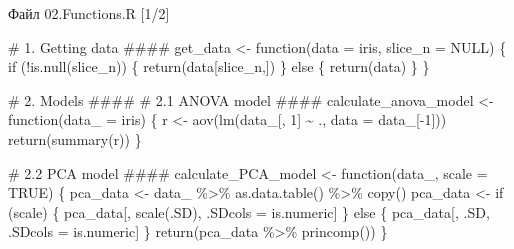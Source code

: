 \documentclass[
  ignorenonframetext,
]{beamer}
\newenvironment{Shaded}{\begin{snugshade}}{\end{snugshade}}
\newcommand{\AttributeTok}[1]{\textcolor[rgb]{0.40,0.45,0.13}{#1}}
\newcommand{\CommentTok}[1]{\textcolor[rgb]{0.37,0.37,0.37}{#1}}
\newcommand{\ConstantTok}[1]{\textcolor[rgb]{0.56,0.35,0.01}{#1}}
\newcommand{\ControlFlowTok}[1]{\textcolor[rgb]{0.00,0.23,0.31}{#1}}
\newcommand{\DecValTok}[1]{\textcolor[rgb]{0.68,0.00,0.00}{#1}}
\newcommand{\FunctionTok}[1]{\textcolor[rgb]{0.28,0.35,0.67}{#1}}
\newcommand{\NormalTok}[1]{\textcolor[rgb]{0.00,0.23,0.31}{#1}}
\newcommand{\OtherTok}[1]{\textcolor[rgb]{0.00,0.23,0.31}{#1}}
\newcommand{\SpecialCharTok}[1]{\textcolor[rgb]{0.37,0.37,0.37}{#1}}
\begin{document}
\begin{frame}[fragile]{Файл 02.Functions.R {[}1/2{]}}
\label{ux444ux430ux439ux43b-02.functions.r-12}
\begin{Shaded}
\begin{Highlighting}[]
\CommentTok{\# 1. Getting data           \#\#\#\#}
\NormalTok{get\_data }\OtherTok{\textless{}{-}} \ControlFlowTok{function}\NormalTok{(}\AttributeTok{data =}\NormalTok{ iris, }\AttributeTok{slice\_n =} \ConstantTok{NULL}\NormalTok{) \{}
  \ControlFlowTok{if}\NormalTok{ (}\SpecialCharTok{!}\FunctionTok{is.null}\NormalTok{(slice\_n)) \{}
    \FunctionTok{return}\NormalTok{(data[slice\_n,])}
\NormalTok{  \} }\ControlFlowTok{else}\NormalTok{ \{}
    \FunctionTok{return}\NormalTok{(data)}
\NormalTok{  \}}
\NormalTok{\}}


\CommentTok{\# 2. Models                 \#\#\#\#}
\CommentTok{\# 2.1 ANOVA model           \#\#\#\#}
\NormalTok{calculate\_anova\_model }\OtherTok{\textless{}{-}} \ControlFlowTok{function}\NormalTok{(}\AttributeTok{data\_ =}\NormalTok{ iris) \{}
\NormalTok{  r }\OtherTok{\textless{}{-}} \FunctionTok{aov}\NormalTok{(}\FunctionTok{lm}\NormalTok{(data\_[, }\DecValTok{1}\NormalTok{] }\SpecialCharTok{\textasciitilde{}}\NormalTok{ ., }\AttributeTok{data =}\NormalTok{ data\_[}\SpecialCharTok{{-}}\DecValTok{1}\NormalTok{]))}
  \FunctionTok{return}\NormalTok{(}\FunctionTok{summary}\NormalTok{(r))}
\NormalTok{\}}


\CommentTok{\# 2.2 PCA model             \#\#\#\#}
\NormalTok{calculate\_PCA\_model }\OtherTok{\textless{}{-}} \ControlFlowTok{function}\NormalTok{(data\_, }\AttributeTok{scale =} \ConstantTok{TRUE}\NormalTok{) \{}
\NormalTok{  pca\_data }\OtherTok{\textless{}{-}}\NormalTok{ data\_ }\SpecialCharTok{\%\textgreater{}\%}
    \FunctionTok{as.data.table}\NormalTok{() }\SpecialCharTok{\%\textgreater{}\%}
    \FunctionTok{copy}\NormalTok{()}
\NormalTok{  pca\_data }\OtherTok{\textless{}{-}} \ControlFlowTok{if}\NormalTok{ (scale) \{}
\NormalTok{    pca\_data[, }\FunctionTok{scale}\NormalTok{(.SD), .SDcols }\OtherTok{=}\NormalTok{ is.numeric]}
\NormalTok{  \} }\ControlFlowTok{else}\NormalTok{ \{}
\NormalTok{    pca\_data[, .SD, .SDcols }\OtherTok{=}\NormalTok{ is.numeric]}
\NormalTok{  \}}
  \FunctionTok{return}\NormalTok{(pca\_data }\SpecialCharTok{\%\textgreater{}\%} \FunctionTok{princomp}\NormalTok{())}
\NormalTok{\}}
\end{Highlighting}
\end{Shaded}
\end{frame}
\end{document}
